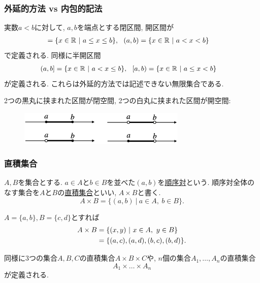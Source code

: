 \begin{frame}
\frametitle{外延的方法 vs 内包的記法}   

\begin{Ex}
実数$a<b$に対して, $a,b$を端点とする閉区間, 開区間が
\begin{align*}
[a,b] = \{x \in \R \ | \ a \le x \le b \}, \ \ (a,b) &=\{x \in \R \ | \ a < x < b \} 
\end{align*}
で定義される. 
同様に半開区間
\begin{align*}
(a,b] = \{x \in \R \ | \ a < x \le b \}, \ \ [a,b) &=\{x \in \R \ | \ a \le x < b \}
\end{align*}
が定義される. 
これらは外延的方法では記述できない無限集合である. 
\end{Ex}

2つの黒丸に挟まれた区間が閉空間, 2つの白丸に挟まれた区間が開空間: 
 \begin{figure}[htbp]
 \begin{center} 
  \includegraphics[width=80mm]{calculus1/interval.png}
 \end{center}
\end{figure}

\end{frame}






\begin{frame}
\frametitle{直積集合}   

\begin{Def}[直積集合]
$A, B$を集合とする. 
$a \in A$と$b \in B$を並べた$(a,b)$を\underline{順序対}という. 
順序対全体のなす集合を$A$と$B$の\underline{直積集合}といい, $A \times B$と書く. 
$$
A \times B = \{(a,b) \ | \ a \in A, \ b \in B\}. 
$$
\end{Def}

$A=\{a,b\}, B=\{c,d\}$とすれば
\begin{align}
A\times B &= \{(x,y) \ | \ x \in A, \ y \in B \} \notag \\
&=\{(a,c), (a,d), (b,c), (b,d)\}.  \notag
\end{align}

同様に3つの集合$A,B,C$の直積集合$A \times B \times C$や, $n$個の集合$A_1,\dots,A_n$の直積集合
$$
A_1 \times \dots \times A_n
$$
が定義される. 



\end{frame}




